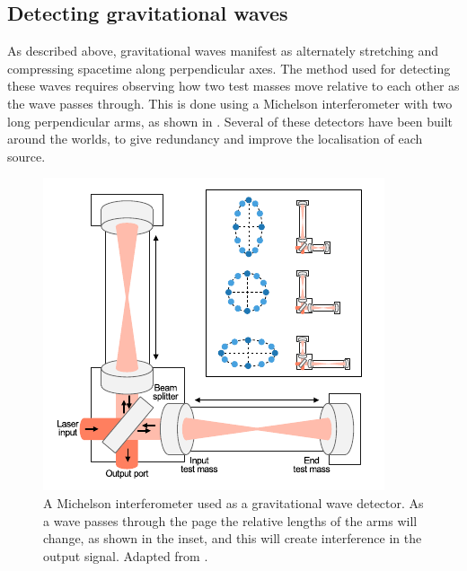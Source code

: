 \begin{colsection}
\begin{colsection}
\end{colsection}

\subsection{Detecting gravitational waves}
\label{sec:gw_detecting}
\begin{colsection}

As described above, gravitational waves manifest as alternately stretching and compressing spacetime along perpendicular axes. The method used for detecting these waves requires observing how two test masses move relative to each other as the wave passes through. This is done using a Michelson interferometer with two long perpendicular arms, as shown in  \citep{BIGbirmingham}. Several of these detectors have been built around the worlds, to give redundancy and improve the localisation of each source.

\begin{figure}[p]
    \begin{center}
        \includegraphics[width=0.6\linewidth]{images/detector.pdf}
    \end{center}
    \caption[A Michelson interferometer used as a gravitational wave detector]{
        A Michelson interferometer used as a gravitational wave detector. As a wave passes through the page the relative lengths of the arms will change, as shown in the inset, and this will create interference in the output signal. Adapted from \citet{GW150914_detectors}.
        }\label{fig:detector}
\end{figure}

\clearpage


\end{colsection}
\end{colsection}
